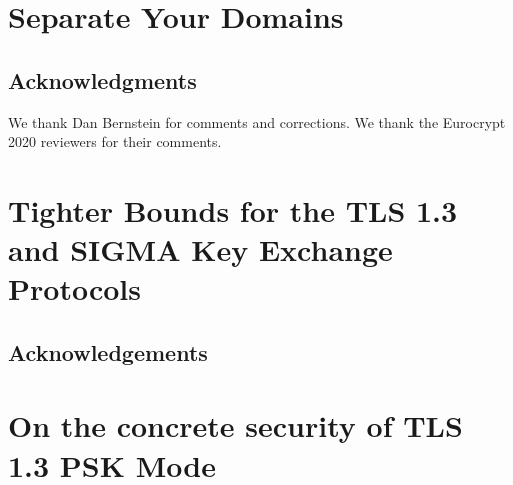 \documentclass[11pt]{ucsddissertation}
\begin{document}
\mainmatter

\begin{dissertationintroduction}

\end{dissertationintroduction}

\chapter{Separate Your Domains}\label{chap:domsep}







\section*{Acknowledgments}

We thank Dan Bernstein for comments and corrections. We thank the Eurocrypt 2020 reviewers for their comments.
 
\chapter{Tighter Bounds for the TLS 1.3 and SIGMA Key Exchange Protocols}\label{chap:tight-ake}










\section*{Acknowledgements}


\chapter{On the concrete security of TLS 1.3 PSK Mode}\label{chap:tight-ake-ext}









\end{document}
